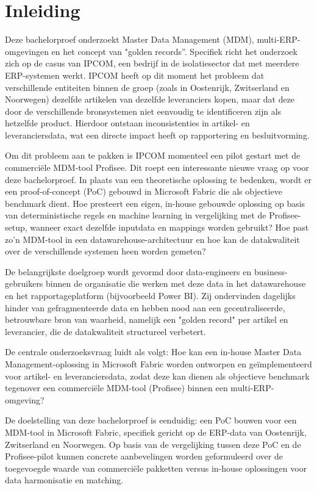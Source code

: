 
\section{Inleiding}
\label{sec:inleiding}
Deze bachelorproef onderzoekt Master Data Management (MDM), multi-ERP-omgevingen en het concept van "golden records''. Specifiek richt het onderzoek zich op de casus van IPCOM, een bedrijf in de isolatiesector dat met meerdere ERP-systemen werkt. IPCOM heeft op dit moment het probleem dat verschillende entiteiten binnen de groep (zoals in Oostenrijk, Zwitserland en Noorwegen) dezelfde artikelen van dezelfde leveranciers kopen, maar dat deze door de verschillende bronsystemen niet eenvoudig te identificeren zijn als hetzelfde product. Hierdoor ontstaan inconsistenties in artikel- en leveranciersdata, wat een directe impact heeft op rapportering en besluitvorming.

Om dit probleem aan te pakken is IPCOM momenteel een pilot gestart met de commerciële MDM-tool Profisee. Dit roept een interessante nieuwe vraag op voor deze bachelorproef. In plaats van een theoretische oplossing te bedenken, wordt er een proof-of-concept (PoC) gebouwd in Microsoft Fabric die als objectieve benchmark dient. Hoe presteert een eigen, in-house gebouwde oplossing op basis van deterministische regels en machine learning in vergelijking met de Profisee-setup, wanneer exact dezelfde inputdata en mappings worden gebruikt? Hoe past zo'n MDM-tool in een datawarehouse-architectuur en hoe kan de datakwaliteit over de verschillende systemen heen worden gemeten?

De belangrijkste doelgroep wordt gevormd door data-engineers en business-gebruikers binnen de organisatie die werken met deze data in het datawarehouse en het rapportageplatform (bijvoorbeeld Power BI). Zij ondervinden dagelijks hinder van gefragmenteerde data en hebben nood aan een gecentraliseerde, betrouwbare bron van waarheid, namelijk een "golden record" per artikel en leverancier, die de datakwaliteit structureel verbetert.

De centrale onderzoeksvraag luidt als volgt: Hoe kan een in-house Master Data Management-oplossing in Microsoft Fabric worden ontworpen en geïmplementeerd voor artikel- en leveranciersdata, zodat deze kan dienen als objectieve benchmark tegenover een commerciële MDM-tool (Profisee) binnen een multi-ERP-omgeving?

De doelstelling van deze bachelorproef is eenduidig: een PoC bouwen voor een MDM-tool in Microsoft Fabric, specifiek gericht op de ERP-data van Oostenrijk, Zwitserland en Noorwegen. Op basis van de vergelijking tussen deze PoC en de Profisee-pilot kunnen concrete aanbevelingen worden geformuleerd over de toegevoegde waarde van commerciële pakketten versus in-house oplossingen voor data harmonisatie en matching.

